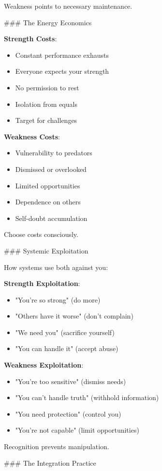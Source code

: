 \documentclass[12pt]{book}
\begin{document}
Weakness points to necessary maintenance.

\#\#\# The Energy Economics

\textbf{Strength Costs}:
\begin{itemize}
\item Constant performance exhausts
\item Everyone expects your strength
\item No permission to rest
\item Isolation from equals
\item Target for challenges

\end{itemize}
\textbf{Weakness Costs}:
\begin{itemize}
\item Vulnerability to predators
\item Dismissed or overlooked
\item Limited opportunities
\item Dependence on others
\item Self-doubt accumulation

\end{itemize}
Choose costs consciously.

\#\#\# Systemic Exploitation

How systems use both against you:

\textbf{Strength Exploitation}:
\begin{itemize}
\item "You're so strong" (do more)
\item "Others have it worse" (don't complain)
\item "We need you" (sacrifice yourself)
\item "You can handle it" (accept abuse)

\end{itemize}
\textbf{Weakness Exploitation}:
\begin{itemize}
\item "You're too sensitive" (dismiss needs)
\item "You can't handle truth" (withhold information)
\item "You need protection" (control you)
\item "You're not capable" (limit opportunities)

\end{itemize}
Recognition prevents manipulation.

\#\#\# The Integration Practice
\end{document}
